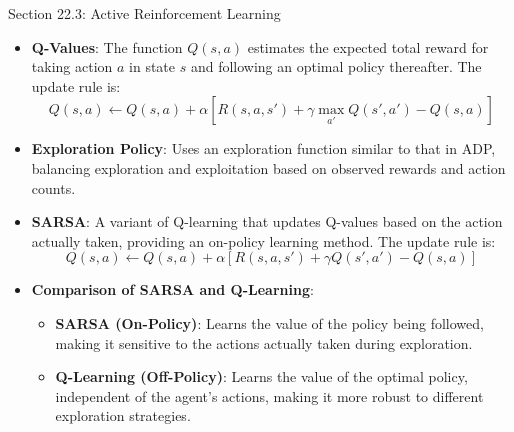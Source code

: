 \begin{notes}{Section 22.3: Active Reinforcement Learning}
\begin{highlight}
        \begin{itemize}
            \item \textbf{Q-Values}: The function $Q(s, a)$ estimates the expected total reward for taking action $a$ in state $s$ and following an optimal policy thereafter. The update rule is:
            \[
            Q(s, a) \leftarrow Q(s, a) + \alpha [R(s, a, s') + \gamma \max_{a'} Q(s', a') - Q(s, a)]
            \]
            \item \textbf{Exploration Policy}: Uses an exploration function similar to that in ADP, balancing exploration and exploitation based on observed rewards and action counts.
            \item \textbf{SARSA}: A variant of Q-learning that updates Q-values based on the action actually taken, providing an on-policy learning method. The update rule is:
            \[
            Q(s, a) \leftarrow Q(s, a) + \alpha [R(s, a, s') + \gamma Q(s', a') - Q(s, a)]
            \]
            \item \textbf{Comparison of SARSA and Q-Learning}:
                \begin{itemize}
                    \item \textbf{SARSA (On-Policy)}: Learns the value of the policy being followed, making it sensitive to the actions actually taken during exploration.
                    \item \textbf{Q-Learning (Off-Policy)}: Learns the value of the optimal policy, independent of the agent's actions, making it more robust to different exploration strategies.
                \end{itemize}
        \end{itemize}
    
    \end{highlight}
    
    \begin{highlight}
    

\end{highlight}
\end{notes}
